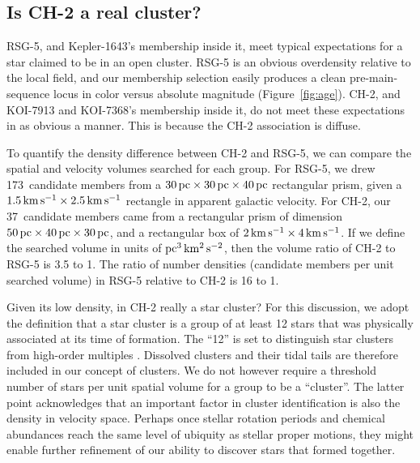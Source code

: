 \documentclass[12pt,twocolumn]{aastex63}
\newcommand{\nchtwo}{37} %
\newcommand{\nrsgfive}{173} %
\newcommand{\mkms}{{\rm \,km\,s^{-1}}}  %
\begin{document}
\subsection{Is CH-2 a real cluster?}
\label{subsec:ch2}

RSG-5, and Kepler-1643's membership inside it, meet typical
expectations for a star claimed to be in an open cluster.  RSG-5 is an
obvious overdensity relative to the local field, and our membership
selection easily produces a clean pre-main-sequence locus in color
versus absolute magnitude (Figure~\ref{fig:age}).  CH-2, and KOI-7913
and KOI-7368's membership inside it, do not meet these expectations in
as obvious a manner.  This is because the CH-2 association is diffuse.

To quantify the density difference between CH-2 and RSG-5, we can
compare the spatial and velocity volumes searched for each group.  For
RSG-5, we drew \nrsgfive\ candidate members from a $30\,{\rm
pc}\times30\,{\rm pc}\times40\,{\rm pc}$ rectangular prism, given a
$1.5 {\rm \mkms} \times 2.5 {\rm \mkms }$ rectangle in apparent
galactic velocity.  For CH-2, our \nchtwo\ candidate members came from
a rectangular prism of dimension $50\,{\rm pc}\times40\,{\rm
pc}\times30\,{\rm pc}$, and a rectangular box of $2 {\rm \mkms} \times
4 {\rm \mkms}$.  If we define the searched volume in units of ${\rm
pc}^3\,{\rm km^2}\,{\rm s^{-2}}$, then the volume ratio of CH-2 to
RSG-5 is 3.5 to 1.  The ratio of number densities (candidate members
per unit searched volume) in RSG-5 relative to CH-2 is 16 to 1.

Given its low density, in CH-2 really a star cluster?  For this
discussion, we adopt the definition that a star cluster is a group of
at least 12 stars that was physically associated at its time of
formation.  The ``12'' is set to distinguish star clusters from
high-order multiples \citep[see][]{krumholz_star_2019}.  Dissolved
clusters and their tidal tails are therefore included in our concept
of clusters.  We do not however require a threshold number of stars
per unit spatial volume for a group to be a ``cluster''.  The latter
point acknowledges that an important factor in cluster identification
is also the density in velocity space.  Perhaps once stellar rotation
periods and chemical abundances reach the same level of ubiquity as
stellar proper motions, they might enable further refinement of our
ability to discover stars that formed together.
\end{document}
